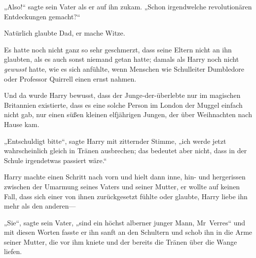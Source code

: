 „Also!“ sagte sein Vater als er auf ihn zukam. „Schon irgendwelche revolutionären Entdeckungen gemacht?“

Natürlich glaubte Dad, er mache Witze.

Es hatte noch nicht ganz so sehr geschmerzt, dass seine Eltern nicht an ihn glaubten, als es auch sonst niemand getan hatte; damals als Harry noch nicht \emph{gewusst} hatte, wie es sich anfühlte, wenn Menschen wie Schulleiter Dumbledore oder Professor Quirrell einen ernst nahmen.

Und da wurde Harry bewusst, dass der Junge-der-überlebte nur im magischen Britannien existierte, dass es eine solche Person im London der Muggel einfach nicht gab, nur einen süßen kleinen elfjährigen Jungen, der über Weihnachten nach Hause kam.

„Entschuldigt bitte“, sagte Harry mit zitternder Stimme, „ich werde jetzt wahrscheinlich gleich in Tränen ausbrechen; das bedeutet aber nicht, dass in der Schule irgendetwas passiert wäre.“

Harry machte einen Schritt nach vorn und hielt dann inne, hin- und hergerissen zwischen der Umarmung seines Vaters und seiner Mutter, er wollte auf keinen Fall, dass sich einer von ihnen zurückgesetzt fühlte oder glaubte, Harry liebe ihn mehr als den anderen—

„Sie“, sagte sein Vater, „sind ein höchst alberner junger Mann, Mr~Verres“ und mit diesen Worten fasste er ihn sanft an den Schultern und schob ihn in die Arme seiner Mutter, die vor ihm kniete und der bereits die Tränen über die Wange liefen.

